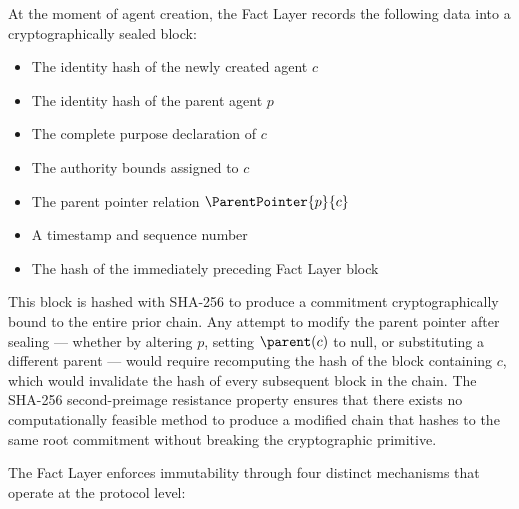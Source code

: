 At the moment of agent creation, the Fact Layer records the following data into a cryptographically sealed block:
\begin{itemize}
    \item The identity hash of the newly created agent $c$
    \item The identity hash of the parent agent $p$
    \item The complete purpose declaration of $c$
    \item The authority bounds assigned to $c$
    \item The parent pointer relation $\ParentPointer{p}{c}$
    \item A timestamp and sequence number
    \item The hash of the immediately preceding Fact Layer block
\end{itemize}

This block is hashed with SHA-256 to produce a commitment cryptographically bound to the entire prior chain. Any attempt to modify the parent pointer after sealing --- whether by altering $p$, setting $\parent(c)$ to null, or substituting a different parent --- would require recomputing the hash of the block containing $c$, which would invalidate the hash of every subsequent block in the chain. The SHA-256 second-preimage resistance property ensures that there exists no computationally feasible method to produce a modified chain that hashes to the same root commitment without breaking the cryptographic primitive.

The Fact Layer enforces immutability through four distinct mechanisms that operate at the protocol level:

